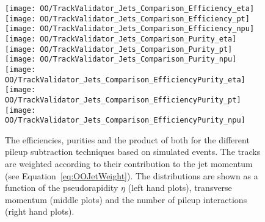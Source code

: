 \begin{figure}[h!t]
  \centering
  \texttt{[image: OO/TrackValidator\_Jets\_Comparison\_Efficiency\_eta]}
  \texttt{[image: OO/TrackValidator\_Jets\_Comparison\_Efficiency\_pt]}
  \texttt{[image: OO/TrackValidator\_Jets\_Comparison\_Efficiency\_npu]}
  \\
  \texttt{[image: OO/TrackValidator\_Jets\_Comparison\_Purity\_eta]}
  \texttt{[image: OO/TrackValidator\_Jets\_Comparison\_Purity\_pt]}
  \texttt{[image: OO/TrackValidator\_Jets\_Comparison\_Purity\_npu]}
  \\
  \texttt{[image: OO/TrackValidator\_Jets\_Comparison\_EfficiencyPurity\_eta]}
  \texttt{[image: OO/TrackValidator\_Jets\_Comparison\_EfficiencyPurity\_pt]}
  \texttt{[image: OO/TrackValidator\_Jets\_Comparison\_EfficiencyPurity\_npu]}
  \caption[Efficiencies, purities and their product for the different pileup subtraction techniques based on simulated \ttbar events with jet weight]{The efficiencies, purities and the product of both for the different pileup subtraction techniques based on simulated \ttbar events. The tracks are weighted according to their contribution to the jet momentum (see Equation~\ref{eq:OOJetWeight}). The distributions are shown as a function of the pseudorapidity $\eta$ (left hand plots), transverse momentum (middle plots) and the number of pileup interactions (right hand plots). \label{plot:OOJetsTVCompTTSignal}}
\end{figure}

